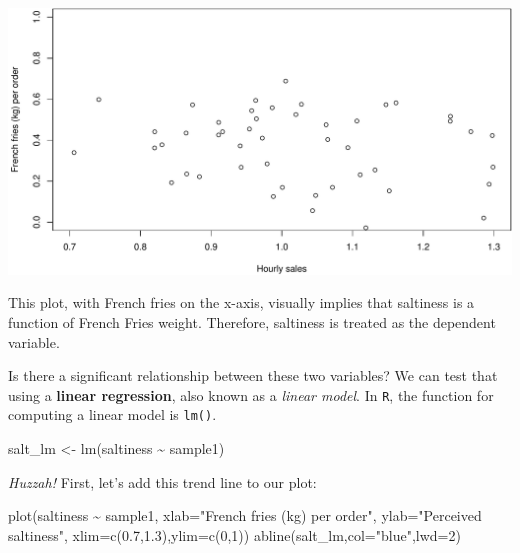 \documentclass[
]{book}
\newenvironment{Shaded}{\begin{snugshade}}{\end{snugshade}}
\newcommand{\AttributeTok}[1]{\textcolor[rgb]{0.77,0.63,0.00}{#1}}
\newcommand{\DecValTok}[1]{\textcolor[rgb]{0.00,0.00,0.81}{#1}}
\newcommand{\FloatTok}[1]{\textcolor[rgb]{0.00,0.00,0.81}{#1}}
\newcommand{\FunctionTok}[1]{\textcolor[rgb]{0.00,0.00,0.00}{#1}}
\newcommand{\NormalTok}[1]{#1}
\newcommand{\OtherTok}[1]{\textcolor[rgb]{0.56,0.35,0.01}{#1}}
\newcommand{\SpecialCharTok}[1]{\textcolor[rgb]{0.00,0.00,0.00}{#1}}
\newcommand{\StringTok}[1]{\textcolor[rgb]{0.31,0.60,0.02}{#1}}
\begin{document}
\includegraphics{figures/unnamed-chunk-241-1.pdf}

This plot, with French fries on the x-axis, visually implies that saltiness is a function of French Fries weight. Therefore, saltiness is treated as the dependent variable.

Is there a significant relationship between these two variables? We can test that using a \textbf{linear regression}, also known as a \emph{linear model}. In \texttt{R}, the function for computing a linear model is \texttt{lm()}.

\begin{Shaded}
\begin{Highlighting}[]
\NormalTok{salt\_lm }\OtherTok{\textless{}{-}} \FunctionTok{lm}\NormalTok{(saltiness }\SpecialCharTok{\textasciitilde{}}\NormalTok{ sample1)}
\end{Highlighting}
\end{Shaded}

\emph{Huzzah!} First, let's add this trend line to our plot:

\begin{Shaded}
\begin{Highlighting}[]
\FunctionTok{plot}\NormalTok{(saltiness }\SpecialCharTok{\textasciitilde{}}\NormalTok{ sample1,}
     \AttributeTok{xlab=}\StringTok{"French fries (kg) per order"}\NormalTok{,}
     \AttributeTok{ylab=}\StringTok{"Perceived saltiness"}\NormalTok{,}
     \AttributeTok{xlim=}\FunctionTok{c}\NormalTok{(}\FloatTok{0.7}\NormalTok{,}\FloatTok{1.3}\NormalTok{),}\AttributeTok{ylim=}\FunctionTok{c}\NormalTok{(}\DecValTok{0}\NormalTok{,}\DecValTok{1}\NormalTok{))}
\FunctionTok{abline}\NormalTok{(salt\_lm,}\AttributeTok{col=}\StringTok{"blue"}\NormalTok{,}\AttributeTok{lwd=}\DecValTok{2}\NormalTok{)}
\end{Highlighting}
\end{Shaded}
\end{document}
